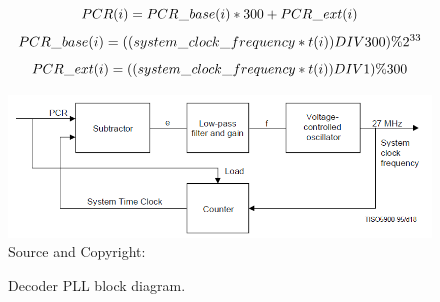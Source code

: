 \documentclass[
	12pt,				%
	openright,			%
	twoside,			%
	a4paper,			%
	brazil,
	french,				%
	english
	]{abntex2}
\begin{document}
\begin{equation}
PCR(i) = PCR\hspace{0.1mm}\_\hspace{0.1mm}base(i) * 300 + PCR\hspace{0.1mm}\_\hspace{0.1mm}ext(i)\\
\label{eq:pcr1}
\end{equation}
\begin{equation}
PCR\hspace{0.1mm}\_\hspace{0.1mm}base(i) = ((system\hspace{0.1mm}\_\hspace{0.1mm}clock\hspace{0.1mm}\_\hspace{0.1mm}frequency * t(i)) DIV 300) \% 2^{33}\\
\label{eq:pcr2}
\end{equation}
\begin{equation}
PCR\hspace{0.1mm}\_\hspace{0.1mm}ext(i) = ((system\hspace{0.1mm}\_\hspace{0.1mm}clock\hspace{0.1mm}\_\hspace{0.1mm}frequency * t(i)) DIV 1) \% 300
\label{eq:pcr3}
\end{equation}


\begin{figure}[!hb]
\centering
\caption{Decoder PLL block diagram.}
\includegraphics[width=1\linewidth]{figuras/pll_decoder.png}
\\Source and Copyright: \cite{ISO}
\label{fig:pll_decoder}
\end{figure}
\end{document}
